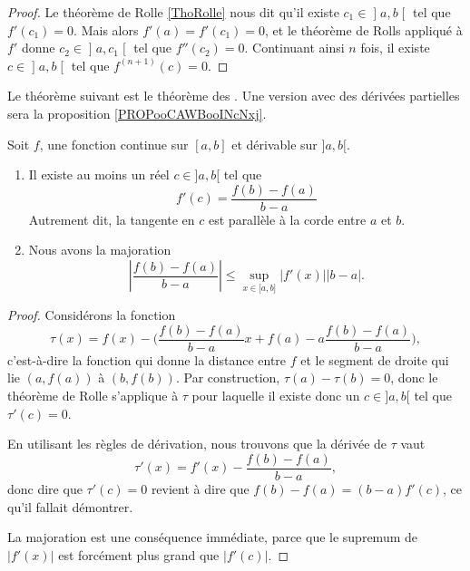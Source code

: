 \begin{proof}
	Le théorème de Rolle \ref{ThoRolle} nous dit qu'il existe \( c_1\in \mathopen] a , b \mathclose[\) tel que \( f'(c_1)=0\). Mais alors \( f'(a)=f'(c_1)=0\), et le théorème de Rolls appliqué à \( f'\) donne \( c_2\in \mathopen] a , c_1 \mathclose[\) tel que \( f''(c_2)=0\). Continuant ainsi \( n\) fois, il existe \( c\in \mathopen] a ,b\mathclose[\) tel que \( f^{(n+1)}(c)=0\).
\end{proof}

Le théorème suivant est le théorème des . Une version avec des dérivées partielles sera la proposition \ref{PROPooCAWBooINcNxj}.
\begin{theorem}       \label{ThoAccFinis}
	Soit \( f\), une fonction continue sur \( [a,b]\) et dérivable sur \( ]a,b[\).
	\begin{enumerate}
		\item       \label{ITEMooFZONooXJqLyX}
		      Il existe au moins un réel \( c\in]a,b[\) tel que
		      \begin{equation}
			      f'(c)=\frac{ f(b)-f(a) }{ b-a }
		      \end{equation}
		      Autrement dit, la tangente en \( c\) est parallèle à la corde entre \( a\) et \( b\).
		\item       \label{ITEMooXRQKooDBFpdQ}
		      Nous avons la majoration
		      \begin{equation}
			      \left| \frac{ f(b)-f(a) }{ b-a } \right| \leq \sup_{x\in\mathopen[ a , b \mathclose]}| f'(x) |  | b-a |.
		      \end{equation}
	\end{enumerate}
\end{theorem}

\begin{proof}
	Considérons la fonction
	\begin{equation}
		\tau(x)=f(x)-\Big( \frac{ f(b)-f(a) }{ b-a }x + f(a) - a\frac{ f(b)-f(a) }{ b-a } \Big),
	\end{equation}
	c'est-à-dire la fonction qui donne la distance entre \( f\) et le segment de droite qui lie \( (a,f(a))\) à \( (b,f(b))\). Par construction, \( \tau(a)-\tau(b)=0\), donc le théorème de Rolle s'applique à \( \tau\) pour laquelle il existe donc un \( c\in]a,b[\) tel que \( \tau'(c)=0\).

	En utilisant les règles de dérivation, nous trouvons que la dérivée de \( \tau\) vaut
	\begin{equation}
		\tau'(x)= f'(x)-\frac{ f(b)-f(a) }{ b-a },
	\end{equation}
	donc dire que \( \tau'(c)=0\) revient à dire que \( f(b)-f(a)=(b-a)f'(c)\), ce qu'il fallait démontrer.

	La majoration est une conséquence immédiate, parce que le supremum de \( | f'(x) |\) est forcément plus grand que \( | f'(c) |\).
\end{proof}

